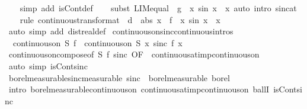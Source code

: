\documentclass[leqno]{article}
\theoremstyle{definition}
\begin{document}
\begin{isabellebody}
\ \ \isamarkupfalse%
\ {\isacharparenleft}simp\ add{\isacharcolon}\ isCont{\isacharunderscore}def{\isacharparenright}\isanewline
\ \ \isamarkupfalse%
\ {\isacharparenleft}subst\ LIM{\isacharunderscore}equal\ {\isacharbrackleft}\ g\ {\isacharequal}\ {\isachardoublequoteopen}{\isasymlambda}x{\isachardot}\ sin\ x\ {\isacharslash}\ x{\isachardoublequoteclose}{\isacharbrackright}{\isacharcomma}\ auto\ intro{\isacharcolon}\ sinc{\isacharunderscore}at{\isacharunderscore}{}{\isacharparenright}\isanewline
\ \ \isamarkupfalse%
\ {\isacharparenleft}rule\ continuous{\isacharunderscore}transform{\isacharunderscore}at\ {\isacharbrackleft}\ d\ {\isacharequal}\ {\isachardoublequoteopen}abs\ x{\isachardoublequoteclose}\ \ f\ {\isacharequal}\ {\isachardoublequoteopen}{\isasymlambda}x{\isachardot}\ sin\ x\ {\isacharslash}\ x{\isachardoublequoteclose}{\isacharbrackright}{\isacharparenright}\isanewline
\ \ \isamarkupfalse%
\ {\isacharparenleft}auto\ simp\ add{\isacharcolon}\ dist{\isacharunderscore}real{\isacharunderscore}def{\isacharparenright}%
\isanewline\isanewline
{}\isamarkupfalse%
\ continuous{\isacharunderscore}on{\isacharunderscore}sinc{\isacharbrackleft}continuous{\isacharunderscore}intros{\isacharbrackright}{\isacharcolon}\isanewline
\ \ {\isachardoublequoteopen}continuous{\isacharunderscore}on\ S\ f\ {\isasymLongrightarrow}\ continuous{\isacharunderscore}on\ S\ {\isacharparenleft}{\isasymlambda}x{\isachardot}\ sinc\ {\isacharparenleft}f\ x{\isacharparenright}{\isacharparenright}{\isachardoublequoteclose}\isanewline
{}\isamarkupfalse%
\ continuous{\isacharunderscore}on{\isacharunderscore}compose{\isacharbrackleft}of\ S\ f\ sinc{\isacharcomma}\ OF\ {\isacharunderscore}\ continuous{\isacharunderscore}at{\isacharunderscore}imp{\isacharunderscore}continuous{\isacharunderscore}on{\isacharbrackright}\isanewline
\ \ \isamarkupfalse%
\ {\isacharparenleft}auto\ simp{\isacharcolon}\ isCont{\isacharunderscore}sinc{\isacharparenright}%
\isanewline\isanewline
{}\isamarkupfalse%
\ borel{\isacharunderscore}measurable{\isacharunderscore}sinc{\isacharbrackleft}measurable{\isacharbrackright}{\isacharcolon}\ {\isachardoublequoteopen}sinc\ {\isasymin}\ borel{\isacharunderscore}measurable\ borel{\isachardoublequoteclose}\isanewline
{}\isamarkupfalse%
\ {\isacharparenleft}intro\ borel{\isacharunderscore}measurable{\isacharunderscore}continuous{\isacharunderscore}on{}\ continuous{\isacharunderscore}at{\isacharunderscore}imp{\isacharunderscore}continuous{\isacharunderscore}on\ ballI\ isCont{\isacharunderscore}sinc{\isacharparenright}%

\end{isabellebody}
\end{document}
